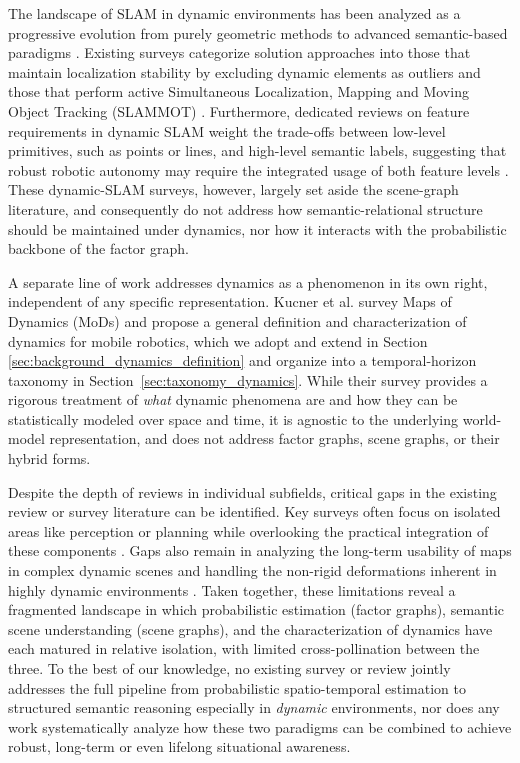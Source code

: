 The landscape of SLAM in dynamic environments has been analyzed as a progressive evolution from purely geometric methods to advanced semantic-based paradigms \cite{wang_survey_2024} \cite{chen_semantic_2025} \cite{wen_semantic_2021}.
Existing surveys categorize solution approaches into those that maintain localization stability by excluding dynamic elements as outliers and those that perform active Simultaneous Localization, Mapping and Moving Object Tracking (SLAMMOT) \cite{wang_-depth_2025} \cite{xu_survey_2021}. 
Furthermore, dedicated reviews on feature requirements in dynamic SLAM weight the trade-offs between low-level primitives, such as points or lines, and high-level semantic labels, suggesting that robust robotic autonomy may require the integrated usage of both feature levels \cite{xu_survey_2021}.
These dynamic-SLAM surveys, however, largely set aside the scene-graph literature, and consequently do not address how semantic-relational structure should be maintained under dynamics, nor how it interacts with the probabilistic backbone of the factor graph.

A separate line of work addresses dynamics as a phenomenon in its own right, independent of any specific representation. Kucner et al.\cite{kucner_survey_2023} survey Maps of Dynamics (MoDs) and propose a general definition and characterization of dynamics for mobile robotics, which we adopt and extend in Section \ref{sec:background_dynamics_definition} and organize into a temporal-horizon taxonomy in Section~\ref{sec:taxonomy_dynamics}. 
While their survey provides a rigorous treatment of \textit{what} dynamic phenomena are and how they can be statistically modeled over space and time, it is agnostic to the underlying world-model representation, and does not address factor graphs, scene graphs, or their hybrid forms.

Despite the depth of reviews in individual subfields, critical gaps in the existing review or survey literature can be identified.  
Key surveys often focus on isolated areas like perception or planning while overlooking the practical integration of these components \cite{khan_foundation_2025} \cite{bavle_slam_2023}.
Gaps also remain in analyzing the long-term usability of maps in complex dynamic scenes and handling the non-rigid deformations inherent in highly dynamic environments \cite{chen_semantic_2025} \cite{luca_carlone_slam_2025}.
Taken together, these limitations reveal a fragmented landscape in which probabilistic estimation (factor graphs), semantic scene understanding (scene graphs), and the characterization of dynamics have each matured in relative isolation, with limited cross-pollination between the three. 
To the best of our knowledge, no existing survey or review jointly addresses the full pipeline from probabilistic spatio-temporal estimation to structured semantic reasoning especially in \textit{dynamic} environments, nor does any work systematically analyze how these two paradigms can be combined to achieve robust, long-term or even lifelong situational awareness.

